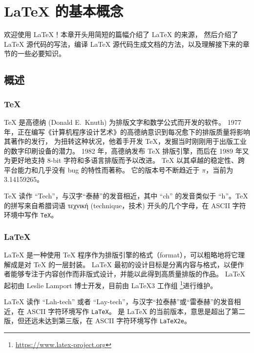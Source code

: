 \chapter{\LaTeX{} 的基本概念}\label{chap:basics}

\begin{intro}
欢迎使用 \LaTeX{}！本章开头用简短的篇幅介绍了 \LaTeX{} 的来源，
然后介绍了 \LaTeX{} 源代码的写法，编译 \LaTeX{} 源代码生成文档的方法，以及理解接下来的章节的一些必要知识。
\end{intro}

\section{概述}\label{sec:intro}

\subsection{\protect\TeX}\label{subsec:tex}

\TeX{} 是高德纳 (Donald E.~Knuth) 为排版文字和数学公式而开发的软件\cite{texbook}。
1977 年，正在编写《计算机程序设计艺术》的高德纳意识到每况愈下的排版质量将影响其著作的发行，
为扭转这种状况，他着手开发 \TeX{}，发掘当时刚刚用于出版工业的数字印刷设备的潜力。
1982 年，高德纳发布 \TeX{} 排版引擎，而后在 1989 年又为更好地支持 8-bit 字符和多语言排版而予以改进。
\TeX{} 以其卓越的稳定性、跨平台能力和几乎没有 bug 的特性而著称。
它的版本号不断趋近于 $\pi$，当前为 3.14159265。

\TeX{} 读作 ``Tech''，与汉字“泰赫”的发音相近，其中 ``ch'' 的发音类似于 ``h''。\TeX{} 的拼写来自希腊词语
τεχνική (technique，技术) 开头的几个字母，在 ASCII 字符环境中写作 \texttt{TeX}。

\subsection{\LaTeX}\label{subsec:latex}

\LaTeX{} 是一种使用 \TeX{} 程序作为排版引擎的格式（format），可以粗略地将它理解成是对 \TeX{} 的一层封装。
\LaTeX{} 最初的设计目标是分离内容与格式，以便作者能够专注于内容创作而非版式设计，并能以此得到高质量排版的作品。
\LaTeX{} 起初由 Leslie Lamport 博士\cite{manual}开发，目前由 \LaTeX 3 工作组%
\footnote{\url{https://www.latex-project.org}}进行维护。

\LaTeX{} 读作 ``Lah-tech'' 或者 ``Lay-tech''，与汉字“拉泰赫”或“雷泰赫”的发音相近，在 ASCII 字符环境写作 \texttt{LaTeX}。
\LaTeXe{} 是 \LaTeX{} 的当前版本，意思是超出了第二版，但还远未达到第三版，在 ASCII 字符环境写作 \texttt{LaTeX2e}。

